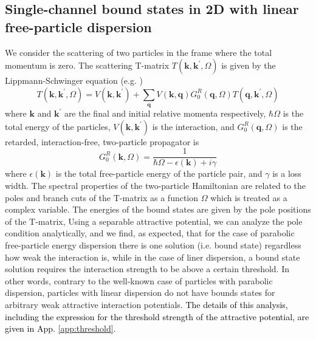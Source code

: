 \documentclass[aps,prb,superscriptaddress,letterpaper,amsmath,amssymb,twocolumn,preprintnumbers]{revtex4}
\newcommand\revisionB[1]{\textcolor{black}{#1}}
\begin{document}
\subsection{Single-channel bound states in 2D with linear free-particle dispersion}\label{single-channel.sec}
\label{sec:threshold}


We consider the scattering of two particles in the frame where the total momentum is zero. The scattering T-matrix $T(\mathbf{k},\mathbf{k}^{\prime},\Omega)$ is given by the Lippmann-Schwinger equation (e.g. \cite{taylor.72})
\begin{equation}\label{T-matrix-1.equ}
T(\mathbf{k},\mathbf{k}^{\prime},\Omega)=V(\mathbf{k},\mathbf{k}^{\prime})+\sum_{\mathbf{q}%
}V(\mathbf{k},\mathbf{q})G_{0}^{R}(\mathbf{q},\Omega)T(\mathbf{q},\mathbf{k}^{\prime},\Omega)
\end{equation}
where $\mathbf{k}$ and $\mathbf{k}^\prime$ are the final and initial relative momenta respectively, $\hbar \Omega$ is the total energy of the particles, $V(\mathbf{k}, \mathbf{k}^{\prime})$ is the interaction, and $G_{0}^{R}(\mathbf{q},\Omega)$ is the retarded, interaction-free, two-particle propagator is
%
\begin{equation}\label{G_0.equ}
G_{0}^{R}(\mathbf{k},\Omega) = \frac {1} {\hbar \Omega - \epsilon(\mathbf{k}) + i \gamma}
\end{equation}
where $\epsilon(\mathbf{k})$ is the total free-particle energy of the particle pair, and $\gamma$ is a loss width.
%
The spectral properties of the two-particle Hamiltonian are related to the poles and branch cuts of the T-matrix as a function $\Omega$ which is treated as a complex variable. The energies of the bound states are given by the pole positions of the T-matrix,
%
Using a separable attractive potential, we can analyze the pole condition analytically, and we find, as expected, that for the case of parabolic free-particle energy
dispersion there is one solution (i.e. bound state) regardless how weak the interaction is, while in the case of liner dispersion, a bound state solution requires the interaction strength to be above a certain threshold. In other words, contrary  to the well-known case of particles with parabolic dispersion, particles with linear dispersion do not have bounds states for arbitrary weak attractive interaction potentials.
\revisionB{
The details of this analysis, including the expression for the threshold strength of the attractive potential, are given in App. \ref{app:threshold}.
}
\end{document}
